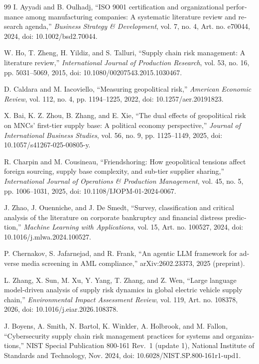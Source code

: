 \begin{otherlanguage}{english}
\begin{thebibliography}{99}
I. Ayyadi and B. Oulhadj, ``ISO 9001 certification and organizational performance among manufacturing companies: A systematic literature review and research agenda,'' \emph{Business Strategy \& Development}, vol. 7, no. 4, Art. no. e70044, 2024, doi: 10.1002/bsd2.70044.

W. Ho, T. Zheng, H. Yildiz, and S. Talluri, ``Supply chain risk management: A literature review,'' \emph{International Journal of Production Research}, vol. 53, no. 16, pp. 5031--5069, 2015, doi: 10.1080/00207543.2015.1030467.

D. Caldara and M. Iacoviello, ``Measuring geopolitical risk,'' \emph{American Economic Review}, vol. 112, no. 4, pp. 1194--1225, 2022, doi: 10.1257/aer.20191823.

X. Bai, K. Z. Zhou, B. Zhang, and E. Xie, ``The dual effects of geopolitical risk on MNCs' first-tier supply base: A political economy perspective,'' \emph{Journal of International Business Studies}, vol. 56, no. 9, pp. 1125--1149, 2025, doi: 10.1057/s41267-025-00805-y.

R. Charpin and M. Cousineau, ``Friendshoring: How geopolitical tensions affect foreign sourcing, supply base complexity, and sub-tier supplier sharing,'' \emph{International Journal of Operations \& Production Management}, vol. 45, no. 5, pp. 1006--1031, 2025, doi: 10.1108/IJOPM-01-2024-0067.

J. Zhao, J. Ouenniche, and J. De Smedt, ``Survey, classification and critical analysis of the literature on corporate bankruptcy and financial distress prediction,'' \emph{Machine Learning with Applications}, vol. 15, Art. no. 100527, 2024, doi: 10.1016/j.mlwa.2024.100527.

P. Chernakov, S. Jafarnejad, and R. Frank, ``An agentic LLM framework for adverse media screening in AML compliance,'' arXiv:2602.23373, 2025 (preprint).

L. Zhang, X. Sun, M. Xu, Y. Yang, T. Zhang, and Z. Wen, ``Large language model-driven analysis of supply risk dynamics in global electric vehicle supply chain,'' \emph{Environmental Impact Assessment Review}, vol. 119, Art. no. 108378, 2026, doi: 10.1016/j.eiar.2026.108378.

J. Boyens, A. Smith, N. Bartol, K. Winkler, A. Holbrook, and M. Fallon, ``Cybersecurity supply chain risk management practices for systems and organizations,'' NIST Special Publication 800-161 Rev.~1 (update 1), National Institute of Standards and Technology, Nov. 2024, doi: 10.6028/NIST.SP.800-161r1-upd1.


\end{thebibliography}
\end{otherlanguage}
